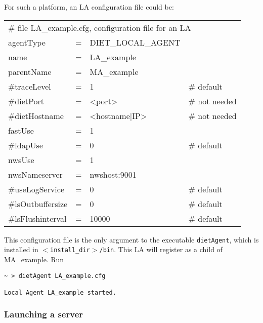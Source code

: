 For such a platform, an LA configuration file could be:
\tt
\begin{center}
 \footnotesize
 \begin{tabular}{lcll}
  \multicolumn{4}{l}{\# file LA\_example.cfg, configuration file for an LA}\\
  agentType    &=&DIET\_LOCAL\_AGENT&\\
  name         &=&LA\_example       &\\
  parentName   &=&MA\_example       &\\
  \#traceLevel &=&1                 &\# default\\
  \#dietPort    &=&<port>             &\# not needed\\
  \#dietHostname&=&<hostname|IP>      &\# not needed\\
  fastUse    &=&1                 &\\
  \#ldapUse    &=&0                 &\# default\\
  nwsUse     &=&1                 &\\
  nwsNameserver&=&nwshost:9001      &\\
  \#useLogService &=& 0               &\# default\\
  \#lsOutbuffersize &=& 0             &\# default\\
  \#lsFlushinterval &=& 10000           &\# default\\
 \end{tabular}
\end{center}
\rm

This configuration file is the only argument to the executable
\texttt{dietAgent}, which is installed in
\texttt{$<$install\_dir$>$/bin}. This LA will register as a child of
MA\_example. Run {\footnotesize
\begin{verbatim}
~ > dietAgent LA_example.cfg

Local Agent LA_example started.

\end{verbatim}
}

\subsubsection{Launching a server}

